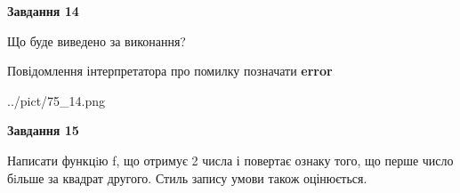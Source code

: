 \documentclass[11pt, ukrainian]{article}
\begin{document}
{\begin {large}
{\begin {center}\textbf{Завдання 14}\end {center}}\par
Що буде виведено за виконання? \par
Повідомлення інтерпретатора про помилку позначати \textbf{error}

\begin{center}
	{../pict/75_14.png}
\end{center}
\newpage

{\begin {center}\textbf{Завдання 15}\end {center}}\par

Написати функцiю f, що отримує 2 числа і повертає ознаку того, що перше число бiльше за квадрат другого. Стиль запису умови також оцінюється.\par
\newpage

\end {large}}
\end{document}
